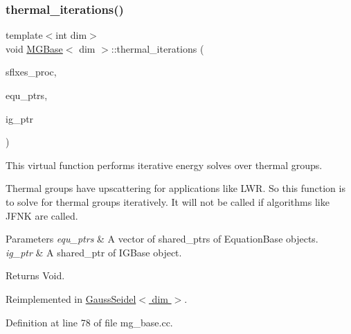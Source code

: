\mbox{\label{class_m_g_base_a9d3c6ab6e58f0119badb30feedb2ac4d}} 
\subsubsection{\texorpdfstring{thermal\+\_\+iterations()}{thermal\_iterations()}}
{\footnotesize\ttfamily template$<$int dim$>$ \\
void \hyperlink{class_m_g_base}{M\+G\+Base}$<$ dim $>$\+::thermal\+\_\+iterations (\begin{DoxyParamCaption}\item[{std\+::vector$<$ Vector$<$ double $>$ $>$ \&}]{sflxes\+\_\+proc,  }\item[{std\+::vector$<$ std\+\_\+cxx11\+::shared\+\_\+ptr$<$ \hyperlink{class_equation_base}{Equation\+Base}$<$ dim $>$ $>$ $>$ \&}]{equ\+\_\+ptrs,  }\item[{std\+\_\+cxx11\+::shared\+\_\+ptr$<$ \hyperlink{class_i_g_base}{I\+G\+Base}$<$ dim $>$ $>$}]{ig\+\_\+ptr }\end{DoxyParamCaption})\hspace{0.3cm}{\ttfamily [virtual]}}

This virtual function performs iterative energy solves over thermal groups.

Thermal groups have upscattering for applications like L\+WR. So this function is to solve for thermal groups iteratively. It will not be called if algorithms like J\+F\+NK are called.


\begin{DoxyParams}{Parameters}
{\em equ\+\_\+ptrs} & A vector of shared\+\_\+ptr\textquotesingle{}s of Equation\+Base objects. \\
\hline
{\em ig\+\_\+ptr} & A shared\+\_\+ptr of I\+G\+Base object. \\
\hline
\end{DoxyParams}
\begin{DoxyReturn}{Returns}
Void. 
\end{DoxyReturn}


Reimplemented in \hyperlink{class_gauss_seidel_a8db6abbdc88413cbf502ac606b415733}{Gauss\+Seidel$<$ dim $>$}.



Definition at line 78 of file mg\+\_\+base.\+cc.



